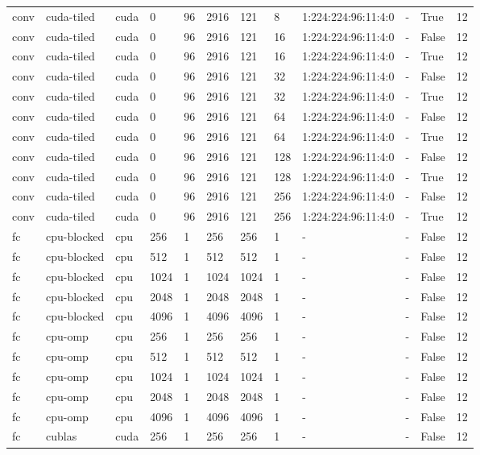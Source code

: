 \begin{tabular}{llllllllllll}
conv & cuda-tiled & cuda & 0 & 96 & 2916 & 121 & 8 & 1:224:224:96:11:4:0 & - & True & 12 \\
conv & cuda-tiled & cuda & 0 & 96 & 2916 & 121 & 16 & 1:224:224:96:11:4:0 & - & False & 12 \\
conv & cuda-tiled & cuda & 0 & 96 & 2916 & 121 & 16 & 1:224:224:96:11:4:0 & - & True & 12 \\
conv & cuda-tiled & cuda & 0 & 96 & 2916 & 121 & 32 & 1:224:224:96:11:4:0 & - & False & 12 \\
conv & cuda-tiled & cuda & 0 & 96 & 2916 & 121 & 32 & 1:224:224:96:11:4:0 & - & True & 12 \\
conv & cuda-tiled & cuda & 0 & 96 & 2916 & 121 & 64 & 1:224:224:96:11:4:0 & - & False & 12 \\
conv & cuda-tiled & cuda & 0 & 96 & 2916 & 121 & 64 & 1:224:224:96:11:4:0 & - & True & 12 \\
conv & cuda-tiled & cuda & 0 & 96 & 2916 & 121 & 128 & 1:224:224:96:11:4:0 & - & False & 12 \\
conv & cuda-tiled & cuda & 0 & 96 & 2916 & 121 & 128 & 1:224:224:96:11:4:0 & - & True & 12 \\
conv & cuda-tiled & cuda & 0 & 96 & 2916 & 121 & 256 & 1:224:224:96:11:4:0 & - & False & 12 \\
conv & cuda-tiled & cuda & 0 & 96 & 2916 & 121 & 256 & 1:224:224:96:11:4:0 & - & True & 12 \\
fc & cpu-blocked & cpu & 256 & 1 & 256 & 256 & 1 & - & - & False & 12 \\
fc & cpu-blocked & cpu & 512 & 1 & 512 & 512 & 1 & - & - & False & 12 \\
fc & cpu-blocked & cpu & 1024 & 1 & 1024 & 1024 & 1 & - & - & False & 12 \\
fc & cpu-blocked & cpu & 2048 & 1 & 2048 & 2048 & 1 & - & - & False & 12 \\
fc & cpu-blocked & cpu & 4096 & 1 & 4096 & 4096 & 1 & - & - & False & 12 \\
fc & cpu-omp & cpu & 256 & 1 & 256 & 256 & 1 & - & - & False & 12 \\
fc & cpu-omp & cpu & 512 & 1 & 512 & 512 & 1 & - & - & False & 12 \\
fc & cpu-omp & cpu & 1024 & 1 & 1024 & 1024 & 1 & - & - & False & 12 \\
fc & cpu-omp & cpu & 2048 & 1 & 2048 & 2048 & 1 & - & - & False & 12 \\
fc & cpu-omp & cpu & 4096 & 1 & 4096 & 4096 & 1 & - & - & False & 12 \\
fc & cublas & cuda & 256 & 1 & 256 & 256 & 1 & - & - & False & 12 \\

\end{tabular}
